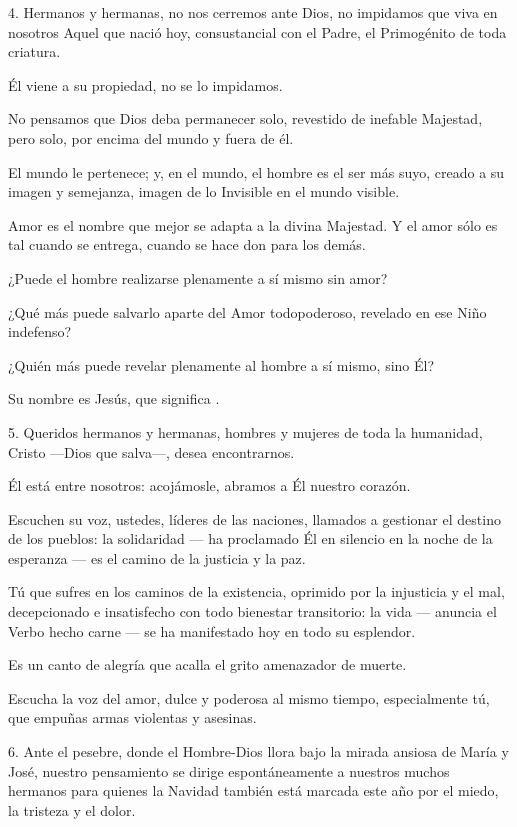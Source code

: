 \begin{body}
	4. Hermanos y hermanas, no nos cerremos ante Dios, no impidamos que viva en nosotros Aquel que nació hoy, consustancial con el Padre, el Primogénito de toda criatura.
	
	Él viene a su propiedad, no se lo impidamos.
	
	No pensamos que Dios deba permanecer solo, revestido de inefable Majestad, pero solo, por encima del mundo y fuera de él.
	
	El mundo le pertenece; y, en el mundo, el hombre es el ser más suyo, creado a su imagen y semejanza, imagen de lo Invisible en el mundo visible.
	
	Amor es el nombre que mejor se adapta a la divina Majestad. Y el amor sólo es tal cuando se entrega, cuando se hace don para los demás.
	
	¿Puede el hombre realizarse plenamente a sí mismo sin amor?
	
	¿Qué más puede salvarlo aparte del Amor todopoderoso, revelado en ese Niño indefenso?
	
	¿Quién más puede revelar plenamente al hombre a sí mismo, sino Él?
	
	Su nombre es Jesús, que significa .
	
	5. Queridos hermanos y hermanas, hombres y mujeres de toda la humanidad, Cristo ---Dios que salva---, desea encontrarnos.
	
	Él está entre nosotros: acojámosle, abramos a Él nuestro corazón.
	
	Escuchen su voz, ustedes, líderes de las naciones, llamados a gestionar el destino de los pueblos: la solidaridad --- ha proclamado Él en silencio en la noche de la esperanza --- es el camino de la justicia y la paz.
	
	Tú que sufres en los caminos de la existencia, oprimido por la injusticia y el mal, decepcionado e insatisfecho con todo bienestar transitorio: la vida --- anuncia el Verbo hecho carne --- se ha manifestado hoy en todo su esplendor.
	
	Es un canto de alegría que acalla el grito amenazador de muerte.
	
	Escucha la voz del amor, dulce y poderosa al mismo tiempo, especialmente tú, que empuñas armas violentas y asesinas.
	
	6. Ante el pesebre, donde el Hombre-Dios llora bajo la mirada ansiosa de María y José, nuestro pensamiento se dirige espontáneamente a nuestros muchos hermanos para quienes la Navidad también está marcada este año por el miedo, la tristeza y el dolor.
	

\end{body}

